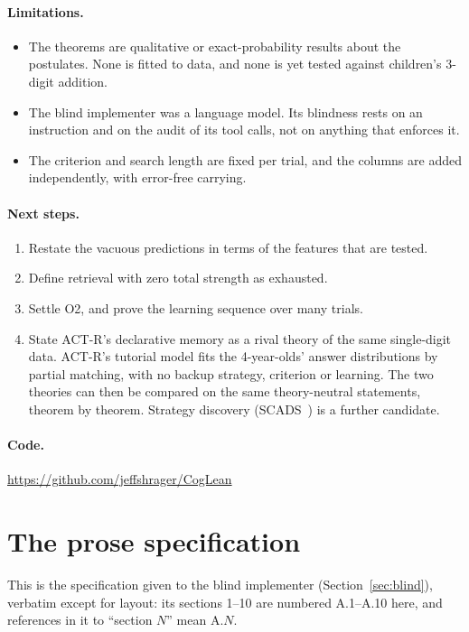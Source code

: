 \documentclass[11pt]{article}
\begin{document}
\paragraph{Limitations.}
\begin{itemize}
  \item The theorems are qualitative or exact-probability results about the postulates. None is fitted to data, and none is yet tested against children's 3-digit addition.
  \item The blind implementer was a language model. Its blindness rests on an instruction and on the audit of its tool calls, not on anything that enforces it.
  \item The criterion and search length are fixed per trial, and the columns are added independently, with error-free carrying.
\end{itemize}

\paragraph{Next steps.}
\begin{enumerate}
  \item Restate the vacuous predictions in terms of the features that are tested.
  \item Define retrieval with zero total strength as exhausted.
  \item Settle O2, and prove the learning sequence over many trials.
  \item State ACT-R's declarative memory as a rival theory of the same single-digit data. ACT-R's tutorial model fits the 4-year-olds' answer distributions by partial matching, with no backup strategy, criterion or learning. The two theories can then be compared on the same theory-neutral statements, theorem by theorem. Strategy discovery (SCADS~\cite{shrager1998}) is a further candidate.
\end{enumerate}

\paragraph{Code.} \url{https://github.com/jeffshrager/CogLean}




\appendix
\section{The prose specification}
\label{app:spec}

This is the specification given to the blind implementer (Section~\ref{sec:blind}), verbatim except for layout: its sections 1--10 are numbered A.1--A.10 here, and references in it to ``section $N$'' mean A.$N$.

{\small\sloppy

}
\end{document}
